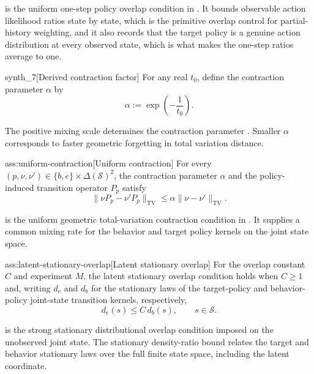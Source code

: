  is the uniform one-step policy overlap condition in \citet{HuWager2023}. It bounds observable action likelihood ratios state by state, which is the primitive overlap control for partial-history weighting, and it also records that the target policy is a genuine action distribution at every observed state, which is what makes the one-step ratios average to one.

\begin{definitionv}{synth_7}[Derived contraction factor]
For any real \(t_0\), define the contraction parameter \(\alpha\) by
\[
\alpha := \exp\!\left(-\frac{1}{t_0}\right).
\]
\end{definitionv}

The positive mixing scale  determines the contraction parameter . Smaller \(\alpha\) corresponds to faster geometric forgetting in total variation distance.

\begin{assumptionv}{ass:uniform-contraction}[Uniform contraction]
For every \((p,\nu,\nu')\in\{b,e\}\times\Delta(\mathcal S)^2\), the contraction parameter \(\alpha\) and the policy-induced transition operator \(P_p\) satisfy
\[
\|\nu P_p-\nu'P_p\|_{\mathrm{TV}}
\le
\alpha\|\nu-\nu'\|_{\mathrm{TV}}.
\]
\end{assumptionv}

 is the uniform geometric total-variation contraction condition in \citet{HuWager2023}. It supplies a common mixing rate for the behavior and target policy kernels on the joint state space.

\begin{assumptionv}{ass:latent-stationary-overlap}[Latent stationary overlap]
For the overlap constant \(C\) and experiment \(M\), the latent stationary overlap condition holds when \(C\ge 1\) and, writing \(d_e\) and \(d_b\) for the stationary laws of the target-policy and behavior-policy joint-state transition kernels, respectively,
\[
d_e(s)\le C\,d_b(s),
\qquad s\in\mathcal S .
\]
\end{assumptionv}

 is the strong stationary distributional overlap condition imposed on the unobserved joint state. The stationary density-ratio bound  relates the target and behavior stationary laws over the full finite state space, including the latent coordinate.

